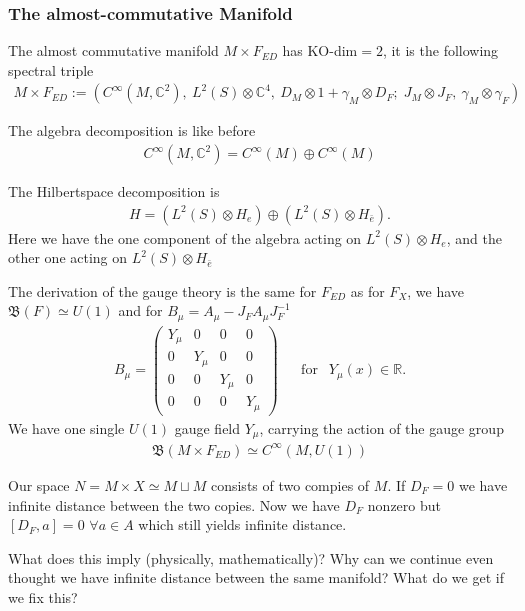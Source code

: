 \subsubsection{The almost-commutative Manifold}
The almost commutative manifold $M\times F_{ED}$ has KO-dim$=2$, it is the
following spectral triple
\begin{align}
    M\times F_{ED} := \left(C^\infty(M,\mathbb{C}^2),\ L^2(S)\otimes
    \mathbb{C}^4,\
    D_M\otimes 1 +\gamma _M \otimes D_F;\; J_M\otimes J_F,\ \gamma_M\otimes
    \gamma _F\right)
\end{align}

The algebra decomposition is like before
\begin{align}
    C^\infty(M, \mathbb{C}^2) = C^\infty (M) \oplus C^\infty (M)
\end{align}

The Hilbertspace decomposition is
\begin{align}
    H = (L^2(S) \otimes H_e ) \oplus (L^2(S) \otimes H_{\bar{e}}).
\end{align}
Here we have the one component of the algebra acting on $L^2(S) \otimes H_e$,
and the other one acting on $L^2(S) \otimes H_{\bar{e}}$
\newline

The derivation of the gauge theory is the same for $F_{ED}$ as for $F_X$, we
have $\mathfrak{B}(F) \simeq U(1)$ and for $B_\mu = A_\mu - J_F A_\mu
J_F^{-1}$
\begin{align} \label{field}
    B_\mu =
    \begin{pmatrix}
        Y_\mu & 0 & 0 & 0 \\
        0 & Y_\mu& 0 & 0 \\
        0 & 0 & Y_\mu& 0 \\
        0 & 0 & 0 & Y_\mu
    \end{pmatrix} \;\;\;\;\;\ \text{for} \;\;\ Y_\mu (x) \in \mathbb{R}.
\end{align}
We have one single $U(1)$ gauge field $Y_\mu$, carrying the action of the
gauge group
\begin{align}
   \text{$\mathfrak{B}$}(M\times F_{ED}) \simeq C^\infty(M, U(1))
\end{align}

Our space $N = M\times X \simeq M\sqcup M$ consists of two compies of $M$.
If $D_F = 0$ we have infinite distance between the two copies. Now we have $D_F$
nonzero but $[D_F, a] = 0$ $\forall a \in A$ which still yields infinite
distance.
\begin{question}
    What does this imply (physically, mathematically)? Why can we continue
    even thought we have infinite distance between the same manifold? What do
    we get if we fix this?
\end{question}

